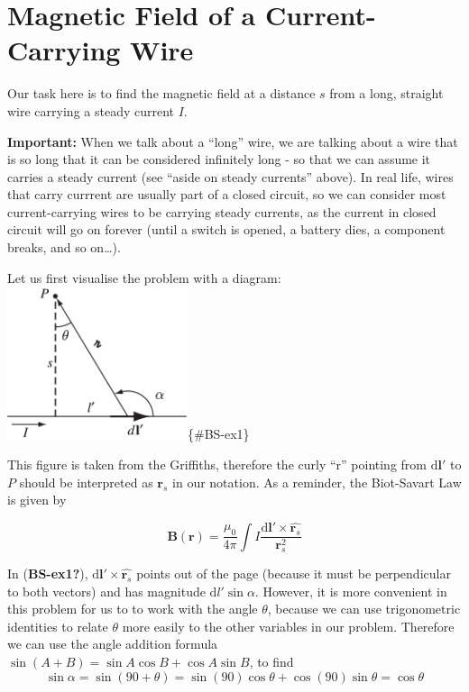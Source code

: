 \documentclass[
  letterpaper,
  DIV=11,
  numbers=noendperiod]{scrreprt}
\begin{document}
\section{Magnetic Field of a Current-Carrying
Wire}\label{magnetic-field-of-a-current-carrying-wire}

Our task here is to find the magnetic field at a distance \(s\) from a
long, straight wire carrying a steady current \(I\).

\textbf{Important:} When we talk about a ``long'' wire, we are talking
about a wire that is so long that it can be considered infinitely long -
so that we can assume it carries a steady current (see ``aside on steady
currents'' above). In real life, wires that carry currrent are usually
part of a closed circuit, so we can consider most current-carrying wires
to be carrying steady currents, as the current in closed circuit will go
on forever (until a switch is opened, a battery dies, a component
breaks, and so on\ldots).

Let us first visualise the problem with a diagram:
\includegraphics[width=2.08333in,height=\textheight]{Figures/BS-example-1.png}\{\#BS-ex1\}

This figure is taken from the Griffiths, therefore the curly ``r''
pointing from \(\mathrm{d} \mathrm{\mathbf{l}}'\) to \(P\) should be
interpreted as \(\mathrm{\mathbf{r}}_s\) in our notation. As a reminder,
the Biot-Savart Law is given by

\[\mathrm{\mathbf{B}}(\mathrm{\mathbf{r}}) =  \frac{\mu_0}{4\pi} \int I \frac{\mathrm{d} \mathrm{\mathbf{l}}' \times \hat{\mathrm{\mathbf{r}}_s} }{\mathrm{\mathbf{r}}_s^2} \]

In (\textbf{BS-ex1?}),
\(\mathrm{d} \mathrm{\mathbf{l}}' \times \hat{\mathrm{\mathbf{r}}_s}\)
points out of the page (because it must be perpendicular to both
vectors) and has magnitude \(\mathrm{d} l' \sin\alpha\). However, it is
more convenient in this problem for us to to work with the angle
\(\theta\), because we can use trigonometric identities to relate
\(\theta\) more easily to the other variables in our problem. Therefore
we can use the angle addition formula
\(\sin(A + B) = \sin A \cos B + \cos A \sin B\), to find
\[ \sin\alpha = \sin(90 + \theta) = \sin(90)\cos\theta + \cos(90)\sin\theta = \cos\theta \]
\end{document}
